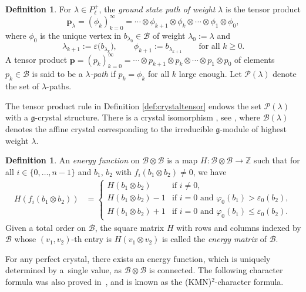 \documentclass[10pt,a4paper]{amsart}
\numberwithin{equation}{section}
\theoremstyle{definition}
\newtheorem{Definition}[Theorem]{Definition}
\begin{document}
\begin{Definition}\label{def:groundstatepath}
For $\lambda \in P^+_\ell$, the \emph{ground state path of weight} $\lambda$ is the tensor product
\[
\mathbf{p}_\lambda = (\phi_k)_{k=0}^{\infty} = \cdots \otimes \phi_{k+1} \otimes \phi_k \otimes \cdots \otimes \phi_1 \otimes \phi_0,
\]
where $\phi_0$ is the unique vertex in $b_{\lambda_0}\in\mathcal{B}$ of weight $\lambda_0:= \lambda$ and
\[
\lambda_{k+1} := \varepsilon\bigl(b_{\lambda_k}\bigr), \qquad \phi_{k+1} := b_{\lambda_{k+1}} \qquad \text{for all } k \geq 0.
\]
A tensor product $\mathbf{p} = (p_k)_{k=0}^{\infty} = \cdots \otimes p_{k+1} \otimes p_k \otimes \cdots \otimes p_1 \otimes p_0$ of elements $p_k \in \mathcal{B}$ is said to be a \emph{$\lambda$-path} if $p_k = \phi_k$ for all $k$ large enough. Let $\mathcal{P}(\lambda)$ denote the set of $\lambda$-paths.
\end{Definition}
The tensor product rule in Definition \ref{def:crystaltensor} endows the set $\mathcal{P}(\lambda)$ with a $\mathfrak{g}$-crystal structure. There is a crystal isomorphism , see \cite[Theorem 10.6.4]{HK02}, where $\mathcal{B}(\lambda)$ denotes the affine crystal corresponding to the irreducible $\mathfrak{g}$-module of highest weight $\lambda$.
\begin{Definition}\label{def:energy}
An \emph{energy function} on $\mathcal{B} \otimes \mathcal{B}$ is a map $H\colon \mathcal{B} \otimes \mathcal{B} \rightarrow \mathbb{Z}$ such that for all $i \in \{0, \dots, n-1\}$ and $b_1$, $b_2$ with $f_i(b_1 \otimes b_2) \neq 0$, we have
\begin{align*}
H\left(f_i(b_1 \otimes b_2)\right) &=
\begin{cases}
H(b_1 \otimes b_2) & \text{if } i \neq 0, \\
H(b_1 \otimes b_2) - 1 & \text{if } i = 0 \text{ and } \varphi_0(b_1) > \varepsilon_0(b_2), \\
H(b_1 \otimes b_2) + 1 & \text{if } i = 0 \text{ and } \varphi_0(b_1) \leq \varepsilon_0(b_2).
\end{cases}
\end{align*}
Given a total order on $\mathcal{B}$, the square matrix $H$ with rows and columns indexed by $\mathcal{B}$ whose \mbox{$(v_1,v_2)$-th} entry is $H(v_1 \otimes v_2)$ is called the \emph{energy matrix} of $\mathcal{B}$.
\end{Definition}

For any perfect crystal, there exists an energy function, which is uniquely determined by a~single value, as $\mathcal{B}\otimes\mathcal{B}$ is connected. The following character formula was also proved in~\cite{KMN92}, and is known as the (KMN)$^2$-character formula.
\end{document}
